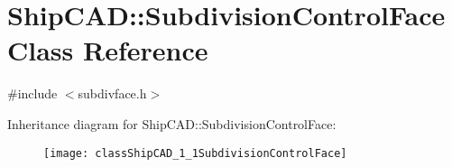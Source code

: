 \hypertarget{classShipCAD_1_1SubdivisionControlFace}{}\section{Ship\+C\+AD\+:\+:Subdivision\+Control\+Face Class Reference}
\label{classShipCAD_1_1SubdivisionControlFace}


{\ttfamily \#include $<$subdivface.\+h$>$}

Inheritance diagram for Ship\+C\+AD\+:\+:Subdivision\+Control\+Face\+:\begin{figure}[H]
\begin{center}
\leavevmode
\texttt{[image: classShipCAD\_1\_1SubdivisionControlFace]}
\end{center}
\end{figure}
